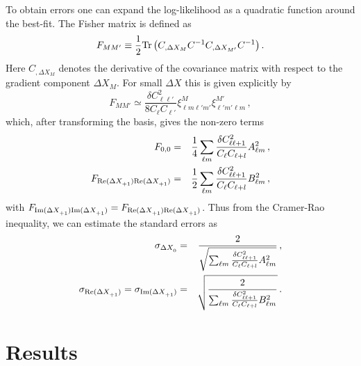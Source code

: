 \documentclass[twocolumn,aps,prd,showpacs]{revtex4}
\def\beq{\begin{equation}}
\def\eeq{\end{equation}}
\def\ld{\left}
\def\rd{\right}
\begin{document}
   To obtain errors one can expand the log-likelihood as a quadratic function 
around the best-fit.  The Fisher matrix is defined as
\beq\label{eqn:fisher}
F_{MM'} \equiv\frac{1}{2}{\rm Tr}\ld(C_{,\Delta X_M}C^{-1}C_{,\Delta X_{M'}}C^{-1}\rd).
\eeq
Here $C_{,\Delta X_M}$ denotes the derivative of the covariance matrix with
respect to the gradient component $\Delta X_M$.  For small $\Delta X$ this is 
given explicitly by
\beq
F_{MM'} \simeq \frac{\delta C_{\ell \ell'}^2}
{8 C_{\ell} C_{\ell'}}  \xi^M_{\ell m \ell' m'} \xi^{M'}_{\ell' m' \ell m}\,,
\eeq
which, after transforming the basis, gives the non-zero terms
\begin{eqnarray}
F_{0,0} &=& \frac{1}{4}\sum_{\ell m}
 \frac{\delta C_{\ell \ell+1}^2}{ C_{\ell} C_{\ell+l}}  A_{\ell m}^2 \,, \\ \nonumber 
F_{ {\rm Re}(\Delta X_{+1}^{})  {\rm Re}(\Delta X_{+1}^{}) }
 &=&  \frac{1}{2}\sum_{\ell m} \frac{\delta C_{\ell \ell+1}^2}{ C_{\ell} C_{\ell+l}}
  B_{\ell m}^2\, ,
\end{eqnarray}
with $F_{{\rm Im}(\Delta X_{+1}^{})  {\rm Im}(\Delta X_{+1}^{}) } 
= F_{ {\rm Re}(\Delta X_{+1}^{})  {\rm Re}(\Delta X_{+1}^{}) }$.  
Thus from the Cramer-Rao inequality, we can estimate the standard errors as
\begin{eqnarray} \label{eqn:errorest}
\sigma_{\Delta X_0^{}} &=& \frac{2}{\sqrt{\sum_{\ell m}
   \frac{\delta C_{\ell\ell+1}^2}{C_{\ell}C_{\ell+l}} A_{\ell m}^2}}\,,\\\nonumber 
\sigma_{ {\rm Re}(\Delta X_{+1}^{})  } = \sigma_{ {\rm Im}(\Delta X_{+1}^{})}
    &=&  \sqrt{\frac{2}{\sum_{\ell m}
         \frac{\delta C_{\ell \ell+1}^2}{ C_{\ell} C_{\ell+l}}  B_{\ell m}^2}}\,.
\end{eqnarray}








\section{Results}
\label{sec:results}







\end{document}
